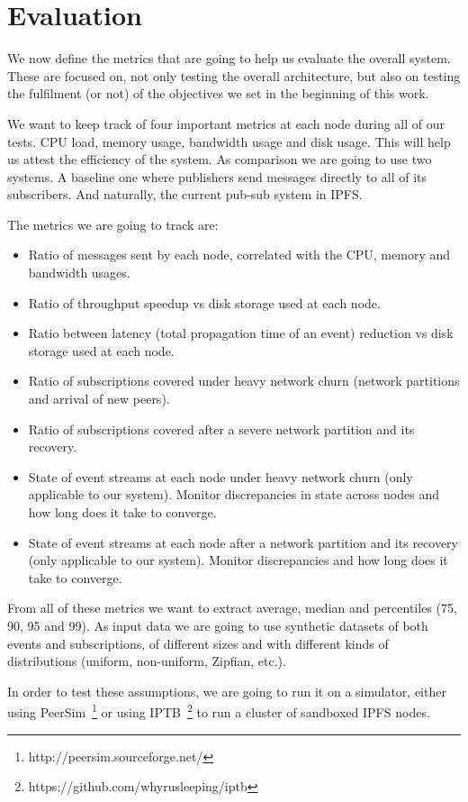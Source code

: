 
%
%

\section{Evaluation}

We now define the metrics that are going to help us evaluate the overall system. These are focused on, not only
testing the overall architecture, but also on testing the fulfilment (or not) of the objectives we set in the beginning of this
work.

We want to keep track of four important metrics at each node during all of our tests. CPU load, memory usage, bandwidth usage and disk usage. This will help us attest the efficiency of the system. As comparison we are going to use two systems. A baseline one where publishers send messages directly to all of its subscribers. And naturally, the current pub-sub system in IPFS.

The metrics we are going to track are:

\begin{itemize}
  \item Ratio of messages sent by each node, correlated with the CPU, memory and bandwidth usages.
  \item Ratio of throughput speedup vs disk storage used at each node.
  \item Ratio between latency (total propagation time of an event) reduction vs disk storage used at each node.
  \item Ratio of subscriptions covered under heavy network churn (network partitions and arrival of new peers).
  \item Ratio of subscriptions covered after a severe network partition and its recovery.
  \item State of event streams at each node under heavy network churn (only applicable to our system). Monitor discrepancies in state across nodes and how long does it take to converge.
  \item State of event streams at each node after a network partition and its recovery (only applicable to our system). Monitor discrepancies and how long does it take to converge.
\end{itemize}

From all of these metrics we want to extract average, median and percentiles (75, 90, 95 and 99). As input data we are going to use synthetic datasets of both events and subscriptions, of different sizes and with different kinds of distributions (uniform, non-uniform, Zipfian, etc.).

In order to test these assumptions, we are going to run it on a simulator, either using PeerSim~\footnote{http://peersim.sourceforge.net/} or using IPTB~\footnote{https://github.com/whyrusleeping/iptb} to run a cluster of sandboxed IPFS nodes.
